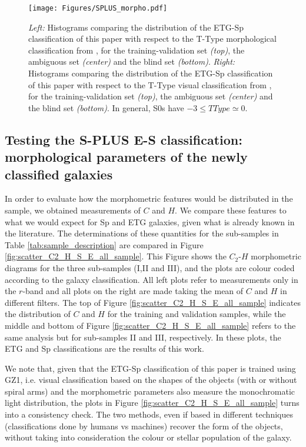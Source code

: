 \documentclass[fleqn,usenatbib]{mnras}
\begin{document}
\begin{figure*}
\texttt{[image: Figures/SPLUS\_morpho.pdf]}
\caption{{\it Left:} Histograms comparing the distribution of the ETG-Sp classification of this paper with respect to the T-Type morphological classification from \citet{Dominguez2018}, for the training-validation set {\it (top)}, the ambiguous set {\it (center)} and the blind set {\it (bottom)}.  {\it Right:} Histograms comparing the distribution of the ETG-Sp classification of this paper with respect to the T-Type visual classification from \citet{Nair2010}, for the training-validation set {\it (top)},  the ambiguous set {\it (center)} and the blind set {\it (bottom)}. In general, S0s have $-3 \le TType \simeq 0$.}
\label{fig:compDeep}
\end{figure*}



\subsection{Testing the S-PLUS E-S classification: morphological parameters of the newly classified galaxies}
\label{subsec:characterization}



In order to evaluate how the morphometric features would be distributed in the sample, we obtained measurements of $C$ and $H$. We compare these features to what we would expect for Sp and ETG galaxies, given what is already known in the literature. The determinations of these quantities for the sub-samples in Table \ref{tab:sample_description} are compared in 
Figure \ref{fig:scatter_C2_H_S_E_all_sample}. This Figure shows the $C_2$-$H$ morphometric diagrams for the three sub-samples (I,II and III), and the plots are colour coded according to the galaxy classification. All left plots refer to measurements only in the $r$-band and all plots on the right are made taking the mean of $C$ and $H$ in different filters.
The top of Figure \ref{fig:scatter_C2_H_S_E_all_sample} indicates the distribution of $C$ and $H$ for the training and validation samples, while the middle and bottom of Figure \ref{fig:scatter_C2_H_S_E_all_sample} refers to the same analysis but for sub-samples II and III, respectively. In these plots, the ETG and Sp classifications are the results of this work.

We note that, given that the ETG-Sp classification of this paper is trained using GZ1, i.e. visual classification based on the shapes of the objects (with or without spiral arms) and the morphometric parameters also measure the monochromatic light distribution, the plots in Figure \ref{fig:scatter_C2_H_S_E_all_sample} turns into a consistency check. The two methods, even if based in different techniques (classifications done by humans vs machines) recover the form of the objects, without taking into consideration the colour or stellar population of the galaxy.
\end{document}
